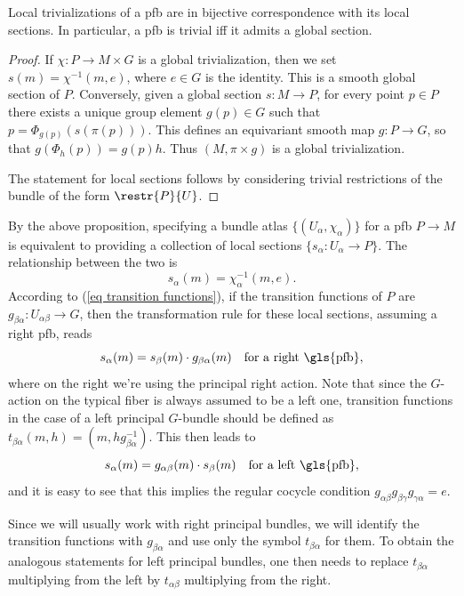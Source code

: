 \begin{prop}[{{\cite[Prop.~1.1.6]{RS2}}}]\label{prop 1.1.6 RS2}
    Local trivializations of a \gls{pfb} are in bijective correspondence with its local sections. In particular, a \gls{pfb} is trivial iff it admits a global section.
\end{prop}
\begin{proof}
    If $\chi:P\to M\times G$ is a global trivialization, then we set $s(m)=\chi^{-1}(m,e)$, where $e\in G$ is the identity. This is a smooth global section of $P$. Conversely, given a global section $s:M\to P$, for every point $p\in P$ there exists a unique group element $g(p)\in G$ such that $p=\Phi_{g(p)}(s(\pi(p)))$. This defines an equivariant smooth map $g:P\to G$, so that $g(\Phi_h(p))=g(p)h$. Thus $(M,\pi\times g)$ is a global trivialization.

    The statement for local sections follows by considering trivial restrictions of the bundle of the form $\restr{P}{U}$.
\end{proof}


\begin{rem}
    By the above proposition, specifying a bundle atlas $\{(U_\alpha,\chi_\alpha)\}$ for a \gls{pfb} $P\to M$ is equivalent to providing a collection of local sections $\{s_\alpha:U_\alpha\to P\}$. The relationship between the two is 
    \[s_\alpha(m)=\chi_\alpha^{-1}(m,e).\]
    According to (\ref{eq transition functions}), if the transition functions of $P$ are $g_{\beta\alpha}:U_{\alpha\beta}\to G$, then the transformation rule for these local sections, assuming a right \gls{pfb}, reads 
    \[s_\alpha(m)=s_\beta(m)\cdot g_{\beta\alpha}(m)\quad \text{for a right \gls{pfb}},\label{eq transf rule for sections}\]
    where on the right we're using the principal right action. Note that since the $G$-action on the typical fiber is always assumed to be a left one, transition functions in the case of a left principal $G$-bundle should be defined as $t_{\beta\alpha}(m,h)=(m,hg_{\beta\alpha}^{-1})$. This then leads to 
    \[s_\alpha(m)=g_{\alpha\beta}(m) \cdot s_\beta(m) \quad \text{for a left \gls{pfb}},\]
    and it is easy to see that this implies the regular cocycle condition $g_{\alpha\beta}g_{\beta\gamma}g_{\gamma\alpha}=e$.

    Since we will usually work with right principal bundles, we will identify the transition functions with $g_{\beta\alpha}$ and use only the symbol $t_{\beta\alpha}$ for them. To obtain the analogous statements for left principal bundles, one then needs to replace $t_{\beta\alpha}$ multiplying from the left by $t_{\alpha\beta}$ multiplying from the right.
\end{rem}


